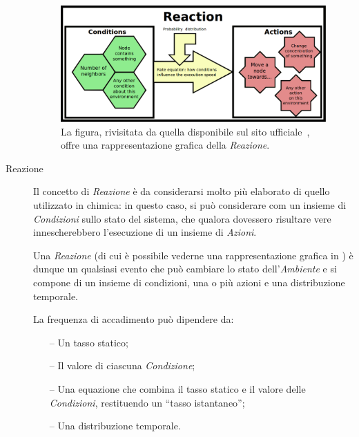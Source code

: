 \begin{description}
                    \begin{figure}[htbp]
                        \centering
                        \includegraphics[scale=.35]{img/reaction}
                        \caption{%
                            La figura, rivisitata da quella disponibile sul sito ufficiale~\cite{alchemistWeb}, offre una rappresentazione grafica della \emph{Reazione}.
                        }
                        \label{fig:react}
                    \end{figure}

                \item[Reazione]\label{itm:react}
                    Il concetto di \emph{Reazione} è da considerarsi molto più elaborato di quello utilizzato in chimica: in questo caso, si può considerare com un insieme di \emph{Condizioni} sullo stato del sistema, che qualora dovessero risultare vere innescherebbero l'esecuzione di un insieme di \emph{Azioni}.

                    Una \emph{Reazione} (di cui è possibile vederne una rappresentazione grafica in ) è dunque un qualsiasi evento che può cambiare lo stato dell’\emph{Ambiente} e si compone di un insieme di condizioni, una o più azioni e una distribuzione temporale.

                    La frequenza di accadimento può dipendere da:
                    \begin{itemize}
                        \item[--] Un tasso statico;
                        \item[--] Il valore di ciascuna \emph{Condizione};
                        \item[--] Una equazione che combina il tasso statico e il valore delle \emph{Condizioni}, restituendo un ``tasso istantaneo'';
                        \item[--] Una distribuzione temporale.
                    \end{itemize}


\end{description}

